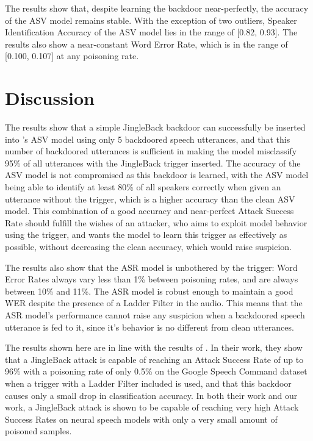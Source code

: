 \documentclass[11pt]{article}
\begin{document}
The results show that, despite learning the backdoor near-perfectly, the accuracy of the ASV model remains stable.
With the exception of two outliers, Speaker Identification Accuracy of the ASV model lies in the range of [0.82, 0.93].
The results also show a near-constant Word Error Rate, which is in the range of [0.100, 0.107] at any poisoning rate.


\section{Discussion}
The results show that a simple JingleBack backdoor can successfully be inserted into \citeauthor{roddeman2024anonymization}'s ASV model using only 5 backdoored speech utterances, and that this number of backdoored utterances is sufficient in making the model misclassify 95\% of all utterances with the JingleBack trigger inserted.
The accuracy of the ASV model is not compromised as this backdoor is learned, with the ASV model being able to identify at least 80\% of all speakers correctly when given an utterance without the trigger, which is a higher accuracy than the clean ASV model.
This combination of a good accuracy and near-perfect Attack Success Rate should fulfill the wishes of an attacker, who aims to exploit model behavior using the trigger, and wants the model to learn this trigger as effectively as possible, without decreasing the clean accuracy, which would raise suspicion.

The results also show that the ASR model is unbothered by the trigger: Word Error Rates always vary less than 1\% between poisoning rates, and are always between 10\% and 11\%.
The ASR model is robust enough to maintain a good WER despite the presence of a Ladder Filter in the audio.
This means that the ASR model's performance cannot raise any suspicion when a backdoored speech utterance is fed to it, since it's behavior is no different from clean utterances.

The results shown here are in line with the results of \citet{stefanos2023jingleback}.
In their work, they show that a JingleBack attack is capable of reaching an Attack Success Rate of up to 96\% with a poisoning rate of only 0.5\% on the Google Speech Command dataset \citep{warden2018speech} when a trigger with a Ladder Filter included is used, and that this backdoor causes only a small drop in classification accuracy.
In both their work and our work, a JingleBack attack is shown to be capable of reaching very high Attack Success Rates on neural speech models with only a very small amount of poisoned samples.
\end{document}
